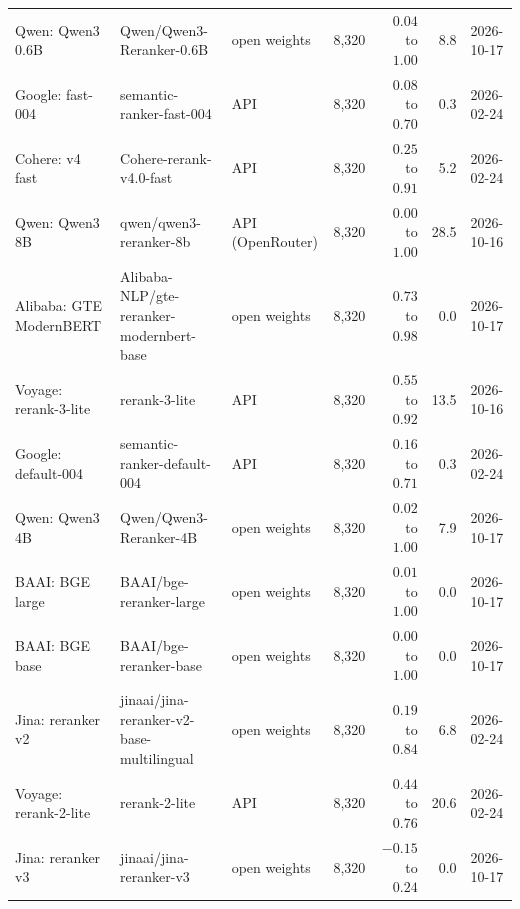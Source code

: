 \begin{tabular}{lllrrrl}
Qwen: Qwen3 0.6B & Qwen/Qwen3-Reranker-0.6B & open weights & 8,320 & $0.04$ to $1.00$ & 8.8 & 2026-10-17 \\
Google: fast-004 & semantic-ranker-fast-004 & API & 8,320 & $0.08$ to $0.70$ & 0.3 & 2026-02-24 \\
Cohere: v4 fast & Cohere-rerank-v4.0-fast & API & 8,320 & $0.25$ to $0.91$ & 5.2 & 2026-02-24 \\
Qwen: Qwen3 8B & qwen/qwen3-reranker-8b & API (OpenRouter) & 8,320 & $0.00$ to $1.00$ & 28.5 & 2026-10-16 \\
Alibaba: GTE ModernBERT & Alibaba-NLP/gte-reranker-modernbert-base & open weights & 8,320 & $0.73$ to $0.98$ & 0.0 & 2026-10-17 \\
Voyage: rerank-3-lite & rerank-3-lite & API & 8,320 & $0.55$ to $0.92$ & 13.5 & 2026-10-16 \\
Google: default-004 & semantic-ranker-default-004 & API & 8,320 & $0.16$ to $0.71$ & 0.3 & 2026-02-24 \\
Qwen: Qwen3 4B & Qwen/Qwen3-Reranker-4B & open weights & 8,320 & $0.02$ to $1.00$ & 7.9 & 2026-10-17 \\
BAAI: BGE large & BAAI/bge-reranker-large & open weights & 8,320 & $0.01$ to $1.00$ & 0.0 & 2026-10-17 \\
BAAI: BGE base & BAAI/bge-reranker-base & open weights & 8,320 & $0.00$ to $1.00$ & 0.0 & 2026-10-17 \\
Jina: reranker v2 & jinaai/jina-reranker-v2-base-multilingual & open weights & 8,320 & $0.19$ to $0.84$ & 6.8 & 2026-02-24 \\
Voyage: rerank-2-lite & rerank-2-lite & API & 8,320 & $0.44$ to $0.76$ & 20.6 & 2026-02-24 \\
Jina: reranker v3 & jinaai/jina-reranker-v3 & open weights & 8,320 & $-0.15$ to $0.24$ & 0.0 & 2026-10-17 \\
\bottomrule
\end{tabular}
